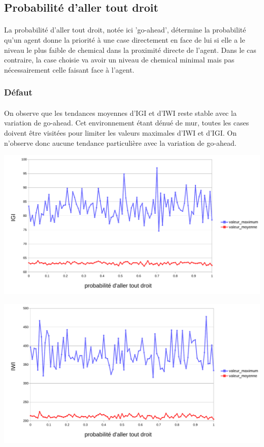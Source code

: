 \documentclass{article}
\begin{document}
    \subsection{Probabilité d'aller tout droit}
    \paragraph{}La probabilité d'aller tout droit, notée ici 'go-ahead', détermine la probabilité qu'un agent donne la priorité à une case directement en face de lui si elle a le niveau le plus faible de chemical dans la proximité directe de l'agent.
    Dans le cas contraire, la case choisie va avoir un niveau de chemical minimal mais pas nécessairement celle faisant face à l'agent. 
    \subsubsection{Défaut}
    \paragraph{}On observe que les tendances moyennes d'IGI et d'IWI reste stable avec la variation de go-ahead. Cet environnement étant dénué de mur, toutes les cases doivent être visitées pour limiter les valeurs maximales d'IWI et d'IGI.
    On n'observe donc aucune tendance particulière avec la variation de go-ahead.
    \begin{center}
        \includegraphics[width = \textwidth]{graphes pdf/variance go-ahead IGI.pdf}
    \end{center}
    \begin{center}
        \includegraphics[width = \textwidth]{graphes pdf/variance go-ahead IWI.pdf}
    \end{center}
\end{document}
